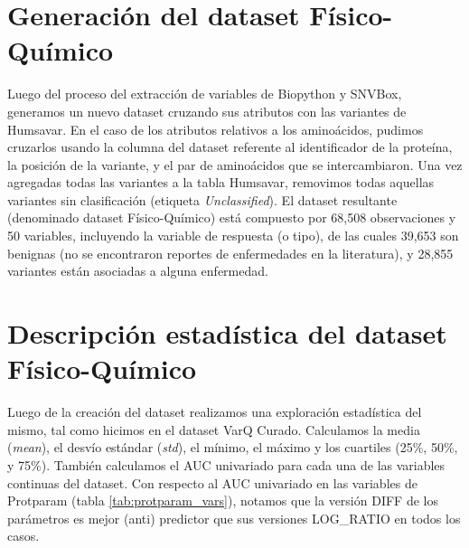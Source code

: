 \section{Generación del dataset Físico-Químico}

Luego del proceso del extracción de variables de Biopython y SNVBox, generamos un nuevo dataset cruzando sus atributos con las variantes de Humsavar. En el caso de los atributos relativos a los aminoácidos, pudimos cruzarlos usando la columna del dataset referente al identificador de la proteína, la posición de la variante, y el par de aminoácidos que se intercambiaron. Una vez agregadas todas las variantes a la tabla Humsavar, removimos todas aquellas variantes sin clasificación (etiqueta \textit{Unclassified}). El dataset resultante (denominado dataset Físico-Químico) está compuesto por 68,508 observaciones y 50 variables, incluyendo la variable de respuesta (o tipo), de las cuales 39,653 son benignas (no se encontraron reportes de enfermedades en la literatura), y 28,855 variantes están asociadas a alguna enfermedad. 

\section{Descripción estadística del dataset Físico-Químico}

Luego de la creación del dataset realizamos una exploración estadística del mismo, tal como hicimos en el dataset VarQ Curado. Calculamos la media (\textit{mean}), el desvío estándar (\textit{std}), el mínimo, el máximo y los cuartiles (25\%, 50\%, y 75\%). También calculamos el AUC univariado para cada una de las variables continuas del dataset. Con respecto al AUC univariado en las variables de Protparam (tabla \ref{tab:protparam_vars}), notamos que la versión DIFF de los parámetros es mejor (anti) predictor que sus versiones LOG\_RATIO en todos los casos.


